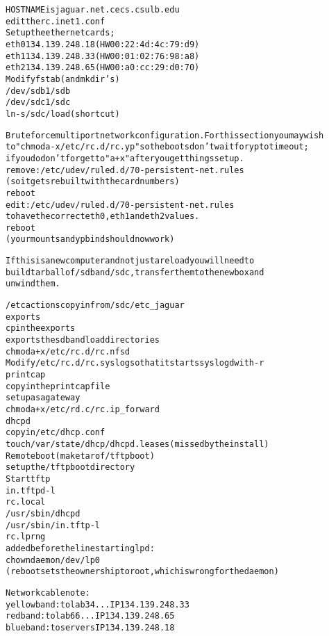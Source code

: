 \begin{alltt}
HOSTNAME is jaguar.net.cecs.csulb.edu
edit the rc.inet1.conf
 Set up the ethernet cards;
   eth0 134.139.248.18  (HW 00:22:4d:4c:79:d9)
   eth1 134.139.248.33  (HW 00:01:02:76:98:a8)
   eth2 134.139.248.65  (HW 00:a0:cc:29:d0:70)
Modify fstab (and mkdir's)
  /dev/sdb1 /sdb
  /dev/sdc1 /sdc
  ln -s /sdc /load (short cut)

Brute force multiport network configuration.  For this section you may wish
to "chmod a-x /etc/rc.d/rc.yp" so the boots don't wait for yp to time out;
if you do don't forget to "a+x" after you get things setup.
 remove: /etc/udev/ruled.d/70-persistent-net.rules
  (so it gets rebuilt with the card numbers)
 reboot
 edit: /etc/udev/ruled.d/70-persistent-net.rules
   to have the correct eth0, eth1 and eth2 values.
 reboot
  (your mounts and ypbind should now work)

If this is a new computer and not just a reload you will need to
build tarball of /sdb and /sdc, transfer them to the new box and
unwind them.

/etc actions copy in from /sdc/etc_jaguar
exports
  cp in the exports 
  exports the sdb and load directories
  chmod a+x /etc/rc.d/rc.nfsd
Modify /etc/rc.d/rc.syslog so that it starts syslogd with -r
printcap
  copy in the printcap file
setup as a gateway
  chmod a+x /etc/rd.c/rc.ip_forward
dhcpd
  copy in /etc/dhcp.conf
  touch /var/state/dhcp/dhcpd.leases (missed by the install)
Remote boot (make tar of /tftpboot)
  set up the /tftpboot directory
Start tftp
  in.tftpd -l
rc.local
  /usr/sbin/dhcpd
  /usr/sbin/in.tftp -l
rc.lprng
  added before the line starting lpd:
    chown daemon /dev/lp0
  (reboot sets the ownership to root, which is wrong for the daemon)

Network cable note:
 yellow band: to lab34... IP 134.139.248.33
 red band:    to lab66... IP 134.139.248.65
 blue band:   to servers  IP 134.139.248.18

\end{alltt}

